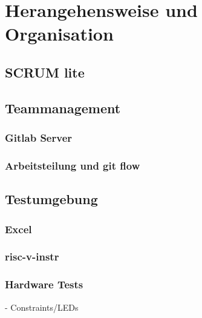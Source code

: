 \chapter{Herangehensweise und Organisation} %
\label{Herangehensweise} %


\section{SCRUM lite}

\section{Teammanagement}
\subsection{Gitlab Server}
\subsection{Arbeitsteilung und git flow}

\section{Testumgebung}
\subsection{Excel}
\subsection{risc-v-instr}
\subsection{Hardware Tests}
- Constraints/LEDs
